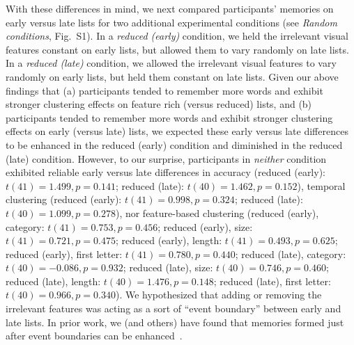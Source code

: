 \documentclass[11pt]{article}
\newcommand{\dynamicsRandom}{S1}
\begin{document}
With these differences in mind, we next compared participants' memories on
early versus late lists for two additional experimental conditions (see
\textit{Random conditions}, Fig.~\dynamicsRandom). In a \textit{reduced
(early)} condition, we held the irrelevant visual features constant on early
lists, but allowed them to vary randomly on late lists. In a \textit{reduced
(late)} condition, we allowed the irrelevant visual features to vary randomly
on early lists, but held them constant on late lists. Given our above findings
that (a) participants tended to remember more words and exhibit stronger
clustering effects on feature rich (versus reduced) lists, and (b) participants
tended to remember more words and exhibit stronger clustering effects on early
(versus late) lists, we expected these early versus late differences to be
enhanced in the reduced (early) condition and diminished in the reduced (late)
condition. However, to our surprise, participants in \textit{neither} condition
exhibited reliable early versus late differences in accuracy (reduced (early):
$t(41) = 1.499, p = 0.141$; reduced (late): $t(40) = 1.462, p = 0.152$),
temporal clustering (reduced (early): $t(41) = 0.998, p = 0.324$; reduced
(late): $t(40) = 1.099, p = 0.278$), nor feature-based clustering (reduced
(early), category: $t(41) = 0.753, p = 0.456$; reduced (early), size: $t(41) =
0.721, p = 0.475$; reduced (early), length: $t(41) = 0.493, p = 0.625$; reduced
(early), first letter: $t(41) = 0.780, p = 0.440$; reduced (late), category:
$t(40) = -0.086, p = 0.932$; reduced (late), size: $t(40) = 0.746, p = 0.460$;
reduced (late), length: $t(40) = 1.476, p = 0.148$; reduced (late), first
letter: $t(40) = 0.966, p = 0.340$). We hypothesized that adding or removing
the irrelevant features was acting as a sort of ``event boundary'' between
early and late lists. In prior work, we (and others) have found that memories
formed just after event boundaries can be enhanced~\citep[e.g., due to less
contextual interference between pre- and post-boundary items;][]{MannEtal16}.
\end{document}
